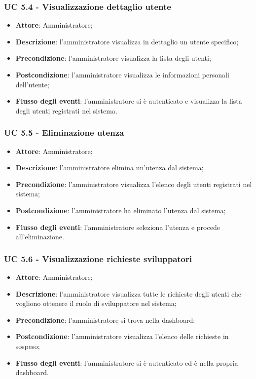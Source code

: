 \subsubsection{UC 5.4 - Visualizzazione dettaglio utente}
\begin{itemize}
\item \textbf{Attore}: Amministratore;
\item \textbf{Descrizione}: l'amministratore visualizza in dettaglio un utente specifico;
\item \textbf{Precondizione}: l'amministratore visualizza la lista degli utenti;
\item \textbf{Postcondizione}: l'amministratore visualizza le informazioni personali dell'utente;
\item \textbf{Flusso degli eventi}: l'amministratore si è autenticato e visualizza la lista degli utenti registrati nel sistema.
\end{itemize}


\subsubsection{UC 5.5 - Eliminazione utenza}
\begin{itemize}
\item \textbf{Attore}: Amministratore;
\item \textbf{Descrizione}: l'amministratore elimina un'utenza dal sistema;
\item \textbf{Precondizione}: l'amministratore visualizza l'elenco degli utenti registrati nel sistema;
\item \textbf{Postcondizione}: l'amministratore ha eliminato l'utenza dal sistema;
\item \textbf{Flusso degli eventi}: l'amministratore seleziona l'utenza e procede all'eliminazione.
\end{itemize}


\subsubsection{UC 5.6 - Visualizzazione richieste sviluppatori}
\begin{itemize}
\item \textbf{Attore}: Amministratore;
\item \textbf{Descrizione}: l'amministratore visualizza tutte le richieste degli utenti che vogliono ottenere il ruolo di sviluppatore nel sistema;
\item \textbf{Precondizione}: l'amministratore si trova nella dashboard;
\item \textbf{Postcondizione}: l'amministratore visualizza l'elenco delle richieste in sospeso;
\item \textbf{Flusso degli eventi}: l'amministratore si è autenticato ed è nella propria dashboard.
\end{itemize}

